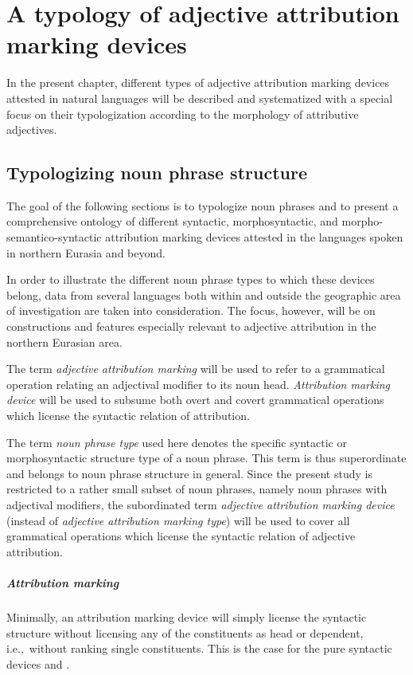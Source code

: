 
\chapter[Typology of attribution marking]{A typology of adjective attribution marking devices} \label{ontology}
In the present chapter, different types of adjective attribution marking devices attested in natural languages will be described and systematized with a special focus on their typologization according to the morphology of attributive adjectives.

\section{Typologizing noun phrase structure}
The goal of the following sections is to typologize noun phrases and to present a comprehensive ontology of different syntactic, morphosyntactic, and morpho-semantico-syntactic attribution marking devices attested in the languages spoken in northern Eurasia and beyond. 

In order to illustrate the different noun phrase types to which these devices belong, data from several languages both within and outside the geographic area of investigation are taken into consideration. The focus, however, will be on constructions and features especially relevant to adjective attribution in the northern Eurasian area.

The term \emph{adjective attribution marking} will be used to refer to a grammatical operation relating an adjectival modifier to its noun head. \emph{Attribution marking device} will be used to subsume both overt and covert grammatical operations which license the syntactic relation of attribution. 

The term \emph{noun phrase type} used here denotes the specific syntactic or morphosyntactic structure type of a noun phrase. This term is thus superordinate and belongs to noun phrase structure in general. Since the present study is restricted to a rather small subset of noun phrases, namely noun phrases with adjectival modifiers, the subordinated term \emph{adjective attribution marking device} (instead of \emph{adjective attribution marking type}) will be used to cover all grammatical operations which license the syntactic relation of adjective attribution.

\paragraph*{Attribution marking} Minimally, an attribution marking device will simply license the syntactic structure without licensing any of the constituents as head or dependent, i.e.,~without ranking single constituents. This is the case for the pure syntactic devices \emph{} and \emph{}.

